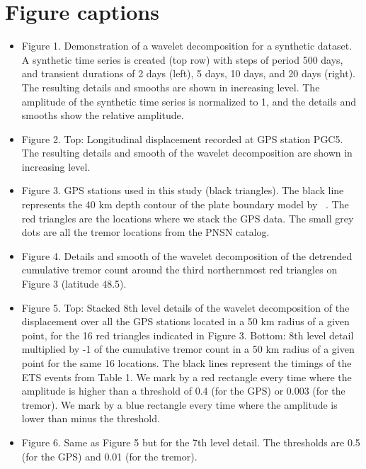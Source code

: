 \documentclass{article}
\begin{document}
\newpage

\section*{Figure captions}

\begin{itemize}

\item Figure 1. Demonstration of a wavelet decomposition for a synthetic dataset. A synthetic time series is created (top row) with steps of period 500 days, and transient durations of 2 days (left), 5 days, 10 days, and 20 days (right). The resulting details and smooths are shown in increasing level. The amplitude of the synthetic time series is normalized to 1, and the details and smooths show the relative amplitude.

\item Figure 2. Top: Longitudinal displacement recorded at GPS station PGC5. The resulting details and smooth of the wavelet decomposition are shown in increasing level.

\item Figure 3. GPS stations used in this study (black triangles). The black line represents the 40 km depth contour of the plate boundary model by ~\citet{PRE_2003}. The red triangles are the locations where we stack the GPS data. The small grey dots are all the tremor locations from the PNSN catalog.

\item Figure 4. Details and smooth of the wavelet decomposition of the detrended cumulative tremor count around the third northernmost red triangles on Figure 3 (latitude 48.5).

\item Figure 5. Top: Stacked 8th level details of the wavelet decomposition of the displacement over all the GPS stations located in a 50 km radius of a given point, for the 16 red triangles indicated in Figure 3. Bottom: 8th level detail multiplied by -1 of the cumulative tremor count in a 50 km radius of a given point for the same 16 locations. The black lines represent the timings of the ETS events from Table 1. We mark by a red rectangle every time where the amplitude is higher than a threshold of 0.4 (for the GPS) or 0.003 (for the tremor). We mark by a blue rectangle every time where the amplitude is lower than minus the threshold.

\item Figure 6. Same as Figure 5 but for the 7th level detail. The thresholds are 0.5 (for the GPS) and 0.01 (for the tremor).


\end{itemize}
\end{document}
